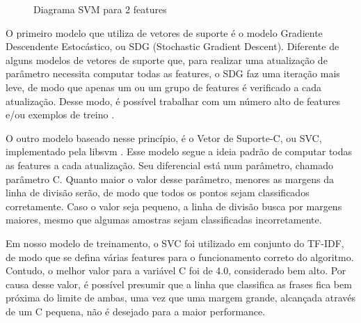 \begin{figure}[!htb]
    \caption{\label{fig:my-label} Diagrama SVM para 2 features}
\end{figure}

O primeiro modelo que utiliza de vetores de suporte é o modelo Gradiente Descendente Estocástico, ou SDG (Stochastic Gradient Descent). Diferente de alguns modelos de vetores de suporte que, para realizar uma atualização de parâmetro necessita computar todas as features, o SDG faz uma iteração mais leve, de modo que apenas um ou um grupo de features é verificado a cada atualização. Desse modo, é possível trabalhar com um número alto de features e/ou exemplos de treino \cite{scikit-learn}.

O outro modelo baseado nesse princípio, é o Vetor de Suporte-C, ou SVC, implementado pela libsvm \cite{libsvm}. Esse modelo segue a ideia padrão de computar todas as features a cada atualização. Seu diferencial está num parâmetro, chamado parâmetro C. Quanto maior o valor desse parâmetro, menores as margens da linha de divisão serão, de modo que todos os pontos sejam classificados corretamente. Caso o valor seja pequeno, a linha de divisão busca por margens maiores, mesmo que algumas amostras sejam classificadas incorretamente.

Em nosso modelo de treinamento, o SVC foi utilizado em conjunto do TF-IDF, de modo que se defina várias features para o funcionamento correto do algoritmo. Contudo, o melhor valor para a variável C foi de 4.0, considerado bem alto. Por causa desse valor, é possível presumir que a linha que classifica as frases fica bem próxima do limite de ambas, uma vez que uma margem grande, alcançada através de um C pequena, não é desejado para a maior performance.

